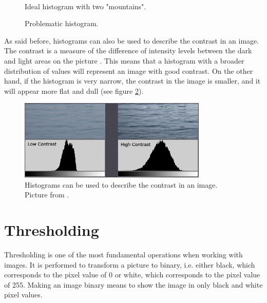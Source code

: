 \begin{figure}[htbp]
\begin{minipage}[b]{0.45\textwidth}
\end{minipage} \\ %
\begin{minipage}[t]{0.45\textwidth}
\caption{Ideal histogram with two "mountains".} %
\label{fig:SimpleThreshold}
\end{minipage} \hfill
\begin{minipage}[t]{0.45\textwidth}
\caption{Problematic histogram.} %
\label{fig:ComplicatedThreshold}
\end{minipage}
\end{figure}

As said before, histograms can also be used to describe the contrast in an image. The contrast is a measure of the difference of intensity levels between the dark and light areas on the picture \citep{histogram}. This means that a histogram with a broader distribution of values will represent an image with good contrast. On the other hand, if the histogram is very narrow, the contrast in the image is smaller, and it will appear more flat and dull (see figure \ref{fig:histogram_contrast}).

\begin{figure}[htbp]
\centering
\includegraphics[width=0.80\textwidth]{Pictures/Theory/hisogram_contrast.png}
\caption{Histograms can be used to describe the contrast in an image. Picture from \citep{histogram}.}
\label{fig:histogram_contrast}
\end{figure}

\section{Thresholding}\label{sec:Thresholding}
Thresholding is one of the most fundamental operations when working with images. It is performed to transform a picture to binary, i.e. either black, which corresponds to the pixel value of 0 or white, which corresponds to the pixel value of 255. Making an image binary means to show the image in only black and white pixel values.

